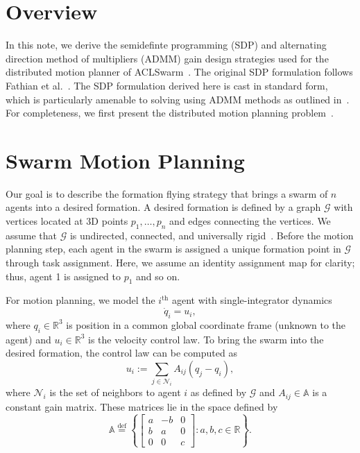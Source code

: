 \documentclass[a4paper]{article}
\begin{document}
\section*{Overview}
In this note, we derive the semidefinte programming (SDP) and alternating direction method of multipliers (ADMM) gain design strategies used for the distributed motion planner of ACLSwarm~\cite{Lusk2020formation}.
The original SDP formulation follows Fathian et al.~\cite{Fathian2018,Fathian2019}.
The SDP formulation derived here is cast in standard form, which is particularly amenable to solving using ADMM methods as outlined in~\cite{Wen2010}.
For completeness, we first present the distributed motion planning problem~\cite{Fathian2018}.

\section*{Swarm Motion Planning}
Our goal is to describe the formation flying strategy that brings a swarm of $n$ agents into a desired formation.
A desired formation is defined by a graph $\mathcal{G}$ with vertices located at 3D points $p_1,\dots,p_n$ and edges connecting the vertices.
We assume that $\mathcal{G}$ is undirected, connected, and universally rigid~\cite{Gortler2014}.
Before the motion planning step, each agent in the swarm is assigned a unique formation point in $\mathcal{G}$ through task assignment.
Here, we assume an identity assignment map for clarity; thus, agent 1 is assigned to $p_1$ and so on.

For motion planning, we model the $i^\text{th}$ agent with single-integrator dynamics
\begin{equation}\label{eq:agent-dynamics}
\dot{q}_i = u_i,
\end{equation}
where $q_i\in\mathbb{R}^3$ is position in a common global coordinate frame (unknown to the agent) and $u_i\in\mathbb{R}^3$ is the velocity control law.
To bring the swarm into the desired formation, the control law can be computed as
\begin{equation}\label{eq:controllaw}
u_i := \sum_{j\in\mathcal{N}_i} A_{ij}\left(q_j - q_i\right),
\end{equation}
where $\mathcal{N}_i$ is the set of neighbors to agent $i$ as defined by $\mathcal{G}$ and $A_{ij}\in\mathbb{A}$ is a constant gain matrix.
These matrices lie in the space defined by
\begin{equation}\label{eq:blockstruct}
\mathbb{A} \stackrel{\text{def}}{=} \left\{ \begin{bmatrix}a&-b&0\\b&a&0\\0&0&c\end{bmatrix} : a,b,c\in\mathbb{R} \right\}.
\end{equation}
\end{document}
